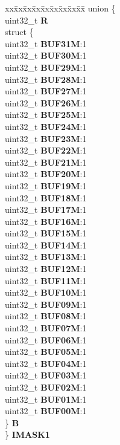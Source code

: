 \begin{DoxyCompactItemize}
\begin{tabbing}
\end{tabbing}\item 
\mbox{\label{structFLEXCAN__tag_aca129573991fb267fa8025252c369852}} 
\begin{tabbing}
xx\=xx\=xx\=xx\=xx\=xx\=xx\=xx\=xx\=\kill
union \{\\
\>uint32\_t {\bfseries R}\\
\>struct \{\\
\>\>uint32\_t {\bfseries BUF31M}:1\\
\>\>uint32\_t {\bfseries BUF30M}:1\\
\>\>uint32\_t {\bfseries BUF29M}:1\\
\>\>uint32\_t {\bfseries BUF28M}:1\\
\>\>uint32\_t {\bfseries BUF27M}:1\\
\>\>uint32\_t {\bfseries BUF26M}:1\\
\>\>uint32\_t {\bfseries BUF25M}:1\\
\>\>uint32\_t {\bfseries BUF24M}:1\\
\>\>uint32\_t {\bfseries BUF23M}:1\\
\>\>uint32\_t {\bfseries BUF22M}:1\\
\>\>uint32\_t {\bfseries BUF21M}:1\\
\>\>uint32\_t {\bfseries BUF20M}:1\\
\>\>uint32\_t {\bfseries BUF19M}:1\\
\>\>uint32\_t {\bfseries BUF18M}:1\\
\>\>uint32\_t {\bfseries BUF17M}:1\\
\>\>uint32\_t {\bfseries BUF16M}:1\\
\>\>uint32\_t {\bfseries BUF15M}:1\\
\>\>uint32\_t {\bfseries BUF14M}:1\\
\>\>uint32\_t {\bfseries BUF13M}:1\\
\>\>uint32\_t {\bfseries BUF12M}:1\\
\>\>uint32\_t {\bfseries BUF11M}:1\\
\>\>uint32\_t {\bfseries BUF10M}:1\\
\>\>uint32\_t {\bfseries BUF09M}:1\\
\>\>uint32\_t {\bfseries BUF08M}:1\\
\>\>uint32\_t {\bfseries BUF07M}:1\\
\>\>uint32\_t {\bfseries BUF06M}:1\\
\>\>uint32\_t {\bfseries BUF05M}:1\\
\>\>uint32\_t {\bfseries BUF04M}:1\\
\>\>uint32\_t {\bfseries BUF03M}:1\\
\>\>uint32\_t {\bfseries BUF02M}:1\\
\>\>uint32\_t {\bfseries BUF01M}:1\\
\>\>uint32\_t {\bfseries BUF00M}:1\\
\>\} {\bfseries B}\\
\} {\bfseries IMASK1}\\


\end{tabbing}
\end{DoxyCompactItemize}
